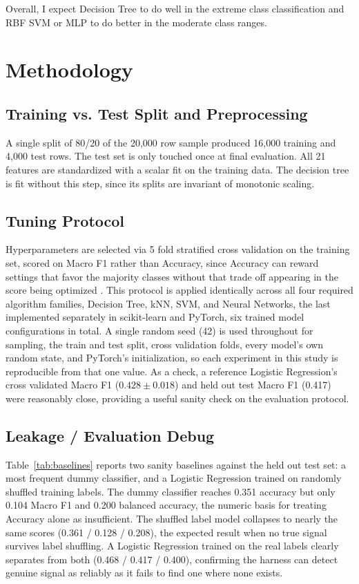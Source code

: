 \documentclass[conference]{IEEEtran}
\begin{document}
Overall, I expect Decision Tree to do well in the extreme class classification and RBF SVM or MLP to do better in the moderate class ranges. 

\section{Methodology}

\subsection{Training vs. Test Split and Preprocessing}

A single split of 80/20 of the 20,000 row sample produced 16,000 training and 4,000 test rows. The test set is only touched once at final evaluation. All 21 features are standardized with a scalar fit on the training data. The decision tree is fit without this step, since its splits are invariant of monotonic scaling. 

\subsection{Tuning Protocol}

Hyperparameters are selected via 5 fold stratified cross validation on the training set, scored on Macro F1 rather than Accuracy, since Accuracy can reward settings that favor the majority classes without that trade off appearing in the score being optimized \cite{he2009}. This protocol is applied identically across all four required algorithm families, Decision Tree, kNN, SVM, and Neural Networks, the last implemented separately in scikit-learn and PyTorch, six trained model configurations in total. A single random seed (42) is used throughout for sampling, the train and test split, cross validation folds, every model's own random state, and PyTorch's initialization, so each experiment in this study is reproducible from that one value. As a check, a reference Logistic Regression's cross validated Macro F1 ($0.428 \pm 0.018$) and held out test Macro F1 (0.417) were reasonably close, providing a useful sanity check on the evaluation protocol.

\subsection{Leakage / Evaluation Debug}

Table~\ref{tab:baselines} reports two sanity baselines against the held out test set: a most frequent dummy classifier, and a Logistic Regression trained on randomly shuffled training labels. The dummy classifier reaches 0.351 accuracy but only 0.104 Macro F1 and 0.200 balanced accuracy, the numeric basis for treating Accuracy alone as insufficient. The shuffled label model collapses to nearly the same scores (0.361 / 0.128 / 0.208), the expected result when no true signal survives label shuffling. A Logistic Regression trained on the real labels clearly separates from both (0.468 / 0.417 / 0.400), confirming the harness can detect genuine signal as reliably as it fails to find one where none exists.
\end{document}
